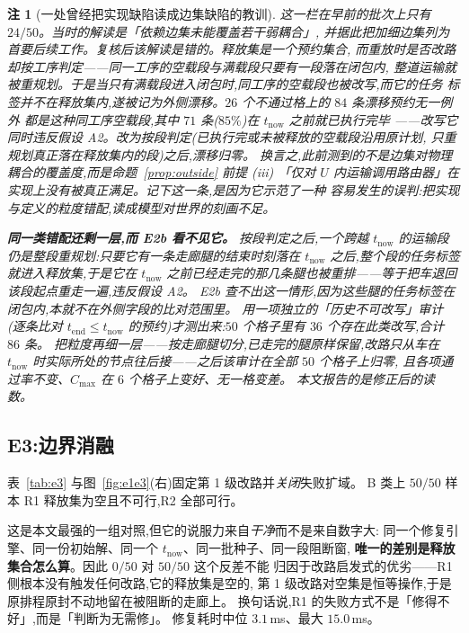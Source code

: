 \documentclass[manuscript,screen,review]{acmart}
\newcommand{\NPairs}{50}
\newcommand{\FeasRone}{0/\NPairs}            %
\newcommand{\FeasRtwo}{\NPairs/\NPairs}      %
\newcommand{\MsRepairMed}{3.1}
\newcommand{\MsRepairMax}{15.0}
\newtheorem{remark}{注}
\begin{document}
\begin{remark}[一处曾经把实现缺陷读成边集缺陷的教训]
\label{rem:e2b_history}
这一栏在早前的批次上只有 \(24/\NPairs\)。当时的解读是「依赖边集未能覆盖若干弱耦合」,
并据此把加细边集列为首要后续工作。复核后该解读是错的。释放集是一个\emph{预约}集合,
而重放时是否改路却按\emph{工序}判定——同一工序的空载段与满载段只要有一段落在闭包内,
整道运输就被重规划。于是当只有满载段进入闭包时,同工序的空载段也被改写,而它的任务
标签并不在释放集内,遂被记为外侧漂移。\(26\) 个不通过格上的 \(84\) 条漂移预约无一例外
都是这种同工序空载段,其中 \(71\) 条(\(85\%\))在 \(t_{\mathrm{now}}\) 之前就已执行完毕
——改写它同时违反假设 A2。改为按\emph{段}判定(已执行完或未被释放的空载段沿用原计划,
只重规划真正落在释放集内的段)之后,漂移归零。
换言之,此前测到的不是边集对物理耦合的覆盖度,而是命题~\ref{prop:outside} 前提 (iii)
「仅对 \(U\) 内运输调用路由器」在实现上没有被真正满足。记下这一条,是因为它示范了一种
容易发生的误判:把实现与定义的粒度错配,读成模型对世界的刻画不足。

\textbf{同一类错配还剩一层,而 E2b 看不见它。} 按段判定之后,一个\emph{跨越}
\(t_{\mathrm{now}}\) 的运输段仍是整段重规划:只要它有一条走廊腿的结束时刻落在
\(t_{\mathrm{now}}\) 之后,整个段的任务标签就进入释放集,于是它在 \(t_{\mathrm{now}}\)
之前\emph{已经走完}的那几条腿也被重排——等于把车退回该段起点重走一遍,违反假设 A2。
E2b 查不出这一情形,因为这些腿的任务标签在闭包\emph{内},本就不在外侧字段的比对范围里。
用一项独立的「历史不可改写」审计(逐条比对 \(t_{\mathrm{end}}\le t_{\mathrm{now}}\)
的预约)才测出来:\(\NPairs\) 个格子里有 \(36\) 个存在此类改写,合计 \(86\) 条。
把粒度再细一层——按\emph{走廊腿}切分,已走完的腿原样保留,改路只从车在
\(t_{\mathrm{now}}\) 时实际所处的节点往后接——之后该审计在全部 \(\NPairs\) 个格子上归零,
且各项通过率不变、\(C_{\max}\) 在 \(6\) 个格子上变好、无一格变差。
本文报告的是修正后的读数。
\end{remark}

\subsection{E3:边界消融}
\label{sec:e3}

表~\ref{tab:e3} 与图~\ref{fig:e1e3}(右)固定第 1 级改路并\emph{关闭}失败扩域。
B 类上 \(\NPairs/\NPairs\) 样本 R1 释放集为空且不可行,R2 全部可行。

这是本文最强的一组对照,但它的说服力来自\emph{干净}而不是来自数字大:
同一个修复引擎、同一份初始解、同一个 \(t_{\mathrm{now}}\)、同一批种子、同一段阻断窗,
\textbf{唯一的差别是释放集合怎么算}。因此 \(\FeasRone\) 对 \(\FeasRtwo\) 这个反差不能
归因于改路启发式的优劣——R1 侧根本没有触发任何改路,它的释放集是空的,
第 1 级改路对空集是恒等操作,于是原排程原封不动地留在被阻断的走廊上。
换句话说,R1 的失败方式不是「修得不好」,而是「判断为无需修」。
修复耗时中位 \(\MsRepairMed\)\,ms、最大 \(\MsRepairMax\)\,ms。
\end{document}

